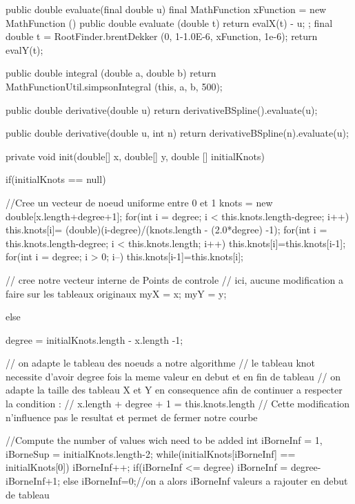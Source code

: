 \begin{htmlonly}
\end{htmlonly}
\begin{code}\begin{hide}
   public double evaluate(final double u) {
      final MathFunction xFunction = new MathFunction () {
         public double evaluate (double t) {
            return evalX(t) - u;
         }
      };
      final double t = RootFinder.brentDekker (0, 1-1.0E-6, xFunction, 1e-6);
      return evalY(t);
   }

   public double integral (double a, double b) {
      return MathFunctionUtil.simpsonIntegral (this, a, b, 500);
   }

   public double derivative(double u) {
      return derivativeBSpline().evaluate(u);
   }

   public double derivative(double u, int n) {
      return derivativeBSpline(n).evaluate(u);
   }

   private void init(double[] x, double[] y, double [] initialKnots) {
      if(initialKnots == null) {
      //Cree un vecteur de noeud uniforme entre 0 et 1
         knots = new double[x.length+degree+1];
         for(int i = degree; i < this.knots.length-degree; i++)
            this.knots[i]= (double)(i-degree)/(knots.length - (2.0*degree) -1);
         for(int i = this.knots.length-degree; i < this.knots.length; i++)
            this.knots[i]=this.knots[i-1];
         for(int i = degree; i > 0; i--)
            this.knots[i-1]=this.knots[i];

      // cree notre vecteur interne de Points de controle
      // ici, aucune modification a faire sur les tableaux originaux
         myX = x;
         myY = y;
      }
      else {
         degree = initialKnots.length - x.length -1;

      // on adapte le tableau des noeuds a notre algorithme
      // le tableau knot necessite d'avoir degree fois la meme valeur en debut et en fin de tableau
      // on adapte la taille des tableau X et Y en consequence afin de continuer a respecter la condition :
      // x.length + degree + 1 = this.knots.length
      // Cette modification n'influence pas le resultat et permet de fermer notre courbe

         //Compute the number of values wich need to be added
         int iBorneInf = 1, iBorneSup = initialKnots.length-2;
         while(initialKnots[iBorneInf] == initialKnots[0])
            iBorneInf++;
         if(iBorneInf <= degree)
            iBorneInf = degree-iBorneInf+1;
         else
            iBorneInf=0;//on a alors iBorneInf valeurs a rajouter en debut de tableau

}}
\end{hide}
\end{code}
